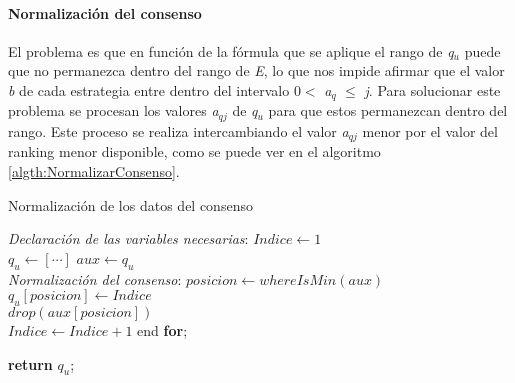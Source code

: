 \paragraph{Normalización del consenso}
El problema es que en función de la fórmula que se aplique el rango de \textit{q$_{u}$} puede que no permanezca dentro del rango de \textit{E}, lo que nos impide afirmar que el valor \textit{b} de cada estrategia entre dentro del intervalo 0$<$
\textit{a$_{q}$ }$\leq$\textit{ j}. Para solucionar este problema se procesan los valores \textit{a$_{qj}$ } de \textit{q$_{u}$} para que estos permanezcan dentro del rango. Este proceso se realiza intercambiando el valor \textit{a$_{qj}$ } menor por el valor del ranking menor disponible, como se puede ver en el algoritmo \ref{algth:NormalizarConsenso}.

\begin{algorithm}[H]
    \caption{Normalización de los datos del consenso}\label{algth:NormalizarConsenso}
    \begin{algorithmic}[1]
            \BState \emph{Declaración de las variables necesarias}:
            \State $Indice \gets 1$
            \\
            \State $q_{u} \gets [\cdots]$
            \State $aux \gets q_{u}$
            \\                
            \BState \emph{Normalización del consenso}:
                \State $posicion \gets whereIsMin(aux)$ 
                \\
                \State $q_{u}[posicion] \gets Indice$ 
                \\
                \State $\textit{drop}(aux[posicion])$ 
                \\
                \State $Indice \gets Indice + 1$ 
            \EndFor
            \State end \textbf{for};

            \State \textbf{return} $q_{u}$;

        \EndProcedure
    \end{algorithmic}
\end{algorithm}

